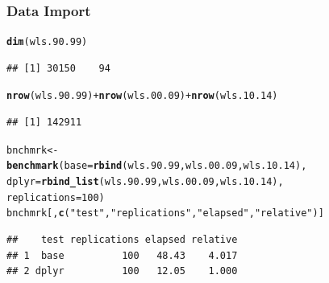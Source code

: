 \documentclass{beamer}\usepackage[]{graphicx}\usepackage[]{color}
\makeatletter
\newcommand{\hlnum}[1]{\textcolor[rgb]{0.686,0.059,0.569}{#1}}%
\newcommand{\hlstr}[1]{\textcolor[rgb]{0.192,0.494,0.8}{#1}}%
\newcommand{\hlopt}[1]{\textcolor[rgb]{0,0,0}{#1}}%
\newcommand{\hlstd}[1]{\textcolor[rgb]{0.345,0.345,0.345}{#1}}%
\newcommand{\hlkwb}[1]{\textcolor[rgb]{0.69,0.353,0.396}{#1}}%
\newcommand{\hlkwc}[1]{\textcolor[rgb]{0.333,0.667,0.333}{#1}}%
\newcommand{\hlkwd}[1]{\textcolor[rgb]{0.737,0.353,0.396}{\textbf{#1}}}%
\newenvironment{kframe}{%
 \def\at@end@of@kframe{}%
 \ifinner\ifhmode%
  \def\at@end@of@kframe{\end{minipage}}%
  \begin{minipage}{\columnwidth}%
 \fi\fi%
 \def\FrameCommand##1{\hskip\@totalleftmargin \hskip-\fboxsep
 \colorbox{shadecolor}{##1}\hskip-\fboxsep
     \hskip-\linewidth \hskip-\@totalleftmargin \hskip\columnwidth}%
 \MakeFramed {\advance\hsize-\width
   \@totalleftmargin\z@ \linewidth\hsize
   \@setminipage}}%
 {\par\unskip\endMakeFramed%
 \at@end@of@kframe}
\newenvironment{knitrout}{}{} %
\makeatother
\begin{document}
\begin{frame}[fragile]
  \frametitle{Data Import}
\begin{knitrout}\footnotesize
{}\color{fgcolor}\begin{kframe}
\begin{alltt}
\hlkwd{dim}\hlstd{(wls.90.99)}
\end{alltt}
\begin{verbatim}
## [1] 30150    94
\end{verbatim}
\begin{alltt}
\hlkwd{nrow}\hlstd{(wls.90.99)} \hlopt{+} \hlkwd{nrow}\hlstd{(wls.00.09)} \hlopt{+} \hlkwd{nrow}\hlstd{(wls.10.14)}
\end{alltt}
\begin{verbatim}
## [1] 142911
\end{verbatim}
\begin{alltt}
\hlstd{bnchmrk} \hlkwb{<-}
  \hlkwd{benchmark}\hlstd{(}\hlkwc{base}  \hlstd{=} \hlkwd{rbind}\hlstd{(wls.90.99, wls.00.09, wls.10.14),}
            \hlkwc{dplyr} \hlstd{=} \hlkwd{rbind_list}\hlstd{(wls.90.99, wls.00.09, wls.10.14),}
            \hlkwc{replications} \hlstd{=} \hlnum{100}\hlstd{)}
\hlstd{bnchmrk[,} \hlkwd{c}\hlstd{(}\hlstr{"test"}\hlstd{,} \hlstr{"replications"}\hlstd{,} \hlstr{"elapsed"}\hlstd{,} \hlstr{"relative"}\hlstd{)]}
\end{alltt}
\begin{verbatim}
##    test replications elapsed relative
## 1  base          100   48.43    4.017
## 2 dplyr          100   12.05    1.000
\end{verbatim}
\end{kframe}
\end{knitrout}
\end{frame} 
\end{document}
